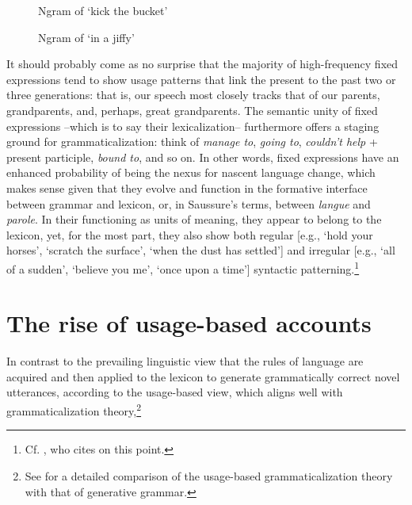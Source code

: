 \documentclass[output=paper]{langsci/langscibook}
\begin{document}
\begin{figure}
\caption{Ngram of ‘kick the bucket’} %
\label{fig:6:2}
\end{figure}

\begin{figure}
\caption{Ngram of ‘in a jiffy’} %
\label{fig:6:3}
\end{figure}

It should probably come as no surprise that the majority of high-frequency fixed expressions tend to show usage patterns that link the present to the past two or three generations: that is, our speech most closely tracks that of our parents, grandparents, and, perhaps, great grandparents. The semantic unity of fixed expressions –which is to say their lexicalization– furthermore offers a staging ground for grammaticalization: think of \textit{manage to}, \textit{going to}, \textit{couldn’t help} + present participle, \textit{bound to}, and so on. In other words, fixed expressions have an enhanced probability of being the nexus for nascent language change, which makes sense given that they evolve and function in the formative interface between grammar and lexicon, or, in Saussure’s terms, between \textit{langue} and \textit{parole}. In their functioning as units of meaning, they appear to belong to the lexicon, yet, for the most part, they also show both regular [e.g., ‘hold your horses’, ‘scratch the surface’, ‘when the dust has settled’] and irregular [e.g., ‘all of a sudden’, ‘believe you me’, ‘once upon a time’] syntactic patterning.\footnote{ \textrm{Cf. \citet[2-3]{wood_formulaic_2002}, who cites \citet[36]{richards_two_1983} on this point.}}

\section{The rise of usage-based accounts}

In contrast to the prevailing linguistic view that the rules of language are acquired and then applied to the lexicon to generate grammatically correct novel utterances, according to the usage-based view, which aligns well with grammaticalization theory,\footnote{ \textrm{See \citet{kibbee_evolution_2010} for a detailed comparison of the usage-based grammaticalization theory with that of generative grammar.}}
\end{document}
